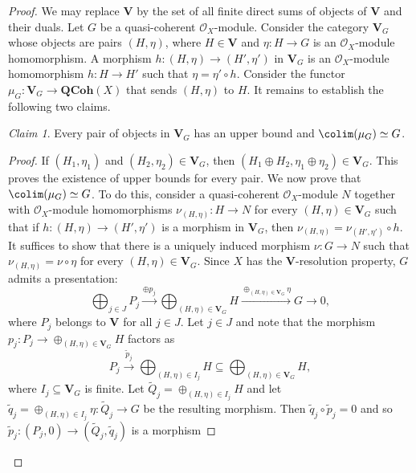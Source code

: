 \documentclass[reqno,a4paper]{amsart}
\numberwithin{Theorem}{section}
\newcommand{\Orb}{\mathcal{O}}
\newcommand{\Vect}{\mathbf{V}}
\newcommand{\QCoh}{\mathbf{QCoh}}
\theoremstyle{plain}
\theoremstyle{remark}
\newtheorem{claim}{Claim}[Theorem]
\begin{document}
\begin{proof}
  We may replace $\Vect$ by the set of all finite direct sums of
  objects of $\Vect$ and their duals.  Let $G$ be a quasi-coherent $\Orb_X$-module.
  Consider the category $\Vect_G$ whose objects are pairs $(H,\eta)$,
  where $H\in \Vect$ and $\eta\colon H \to G$ is an
  $\Orb_X$-module homomorphism. A morphism
  $h\colon (H,\eta) \to (H',\eta')$ in $\Vect_G$ is an $\Orb_X$-module
  homomorphism $h\colon H \to H'$ such that $\eta = \eta'\circ
  h$. Consider the functor $\mu_G \colon \Vect_G \to \QCoh(X)$ that
  sends $(H,\eta)$ to $H$. It remains to establish the following two
  claims.
  \begin{claim}\label{TC:schappi:colim}
    Every pair of objects in $\Vect_G$ has an upper bound and
    $\colim(\mu_G) \simeq G$.
  \end{claim}
    \begin{proof}
      \renewcommand{\qedsymbol}{$\blacksquare$} If $(H_1,\eta_1)$ and
      $(H_2,\eta_2) \in \Vect_G$, then
      $(H_1\oplus H_2,\eta_1\oplus \eta_2) \in \Vect_G$. This proves
      the existence of upper bounds for every pair. We now prove that
      $\colim(\mu_G) \simeq G$. To do this, consider a quasi-coherent
      $\Orb_X$-module $N$ together with $\Orb_X$-module homomorphisms
      $\nu_{(H,\eta)} \colon H \to N$ for every $(H,\eta) \in \Vect_G$
      such that if $h\colon (H,\eta) \to (H',\eta')$ is a morphism in
      $\Vect_G$, then $\nu_{(H,\eta)} = \nu_{(H',\eta')} \circ h$. It
      suffices to show that there is a uniquely induced morphism
      $\nu \colon G \to N$ such that $\nu_{(H,\eta)} = \nu \circ \eta$
      for every $(H,\eta) \in \Vect_G$. Since $X$ has the $\Vect$-resolution
      property, $G$ admits a presentation:
      \[
        \bigoplus_{j\in J} P_j \xrightarrow{\oplus p_j}
          \bigoplus_{(H,\eta)\in \Vect_G} H \xrightarrow{\oplus_{(H,\eta)\in\Vect_G} \eta} G \to 0,
      \]
      where $P_j$ belongs to $\Vect$ for all $j\in J$. Let
      $j\in J$ and note that the morphism
      $p_j \colon P_j \to \oplus_{(H,\eta)\in \Vect_G} H$ factors as
      \[
        P_j \xrightarrow{\tilde{p}_j} \bigoplus_{(H,\eta)\in I_j} H
        \subseteq \bigoplus_{(H,\eta)\in \Vect_G} H,
      \]
      where $I_j \subseteq \Vect_G$ is finite. Let
      $\tilde{Q}_j = \oplus_{(H,\eta)\in I_j} H$ and let
      $\tilde{q}_j = \oplus_{(H,\eta) \in I_j} \eta \colon \tilde{Q}_j \to G$ be the
      resulting morphism. Then $\tilde{q}_j\circ \tilde{p}_j = 0$ and
      so $\tilde{p}_j\colon (P_j,0) \to (\tilde{Q}_j,\tilde{q}_j)$ is a morphism

\end{proof}
\end{proof}
\end{document}
